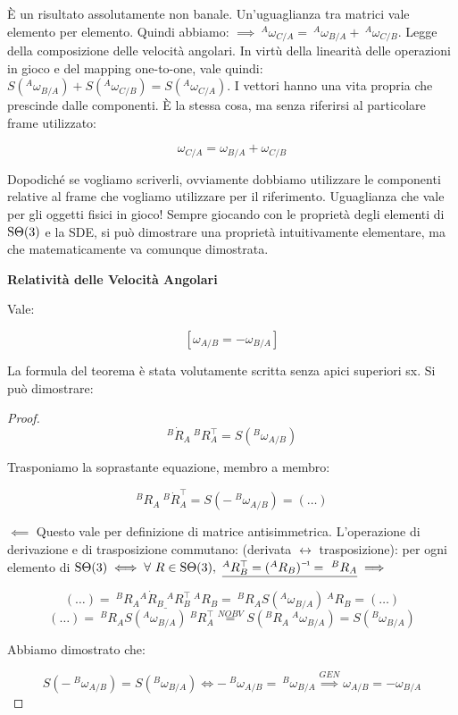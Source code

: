 \`E un risultato assolutamente non banale. Un'uguaglianza tra matrici vale elemento per elemento. Quindi abbiamo: $\implies\ ^A\omega_{C/A} =\ ^A\omega_{B/A} +\ ^A\omega_{C/B}$. Legge della composizione delle velocità angolari. In virtù della linearità delle operazioni in gioco e del mapping one-to-one, vale quindi: $S(^A\omega_{B/A}) + S(^A\omega_{C/B}) = S(^A\omega_{C/A})$. I vettori hanno una vita propria che prescinde dalle componenti. \`E la stessa cosa, ma senza riferirsi al particolare frame utilizzato:

\[
	\omega_{C/A} = \omega_{B/A} + \omega_{C/B}
\]

Dopodiché se vogliamo scriverli, ovviamente dobbiamo utilizzare le componenti relative al frame che vogliamo utilizzare per il riferimento. Uguaglianza che vale per gli oggetti fisici in gioco! Sempre giocando con le proprietà degli elementi di $\operatorname{S\Theta}(3)$ e la SDE, si può dimostrare una proprietà intuitivamente elementare, ma che matematicamente va comunque dimostrata.

\begin{thrm}{\textbf{Relatività delle Velocità Angolari}}

Vale:

\[
	[\omega_{A/B} = -\omega_{B/A}]
\]

\end{thrm}

La formula del teorema è stata volutamente scritta senza apici superiori sx. Si può dimostrare:

\begin{proof}

\[
	^B\dot{R}_A\ ^BR_A^\top = S(^B\omega_{A/B})
\]

Trasponiamo la soprastante equazione, membro a membro:

\[
	^BR_A\ ^B\dot{R}_A^\top = S(-\ ^B\omega_{A/B}) = (\dots)
\]

$\impliedby$ Questo vale per definizione di matrice antisimmetrica. L'operazione di derivazione e di trasposizione commutano: (derivata $\leftrightarrow$ trasposizione): per ogni elemento di $\SO(3) \iff\forall\ R\in\SO(3),\ \underline{{^A}R_B^\top = \inv{(^AR_B)} =\ ^BR_A} \implies$

\[
	(\dots) =\ ^BR_A\underline{{^A}\dot{R}_B\ ^AR_B^\top}\ ^AR_B =\ ^BR_AS(^A\omega_{B/A})\ ^AR_B = (\dots)
\]
\[
	(\dots) =\ ^BR_AS(^A\omega_{B/A})\ ^BR_A^\top \stackrel{NOBV}{=} S(^BR_A\ ^A\omega_{B/A}) = S(^B\omega_{B/A})
\]

Abbiamo dimostrato che:

\[
	S(-\ ^B\omega_{A/B}) = S(^B\omega_{B/A})  \iff -\ ^B\omega_{A/B} =\ ^B\omega_{B/A} \stackrel{GEN}{\implies} \omega_{A/B} = -\omega_{B/A}
\]

\end{proof}

